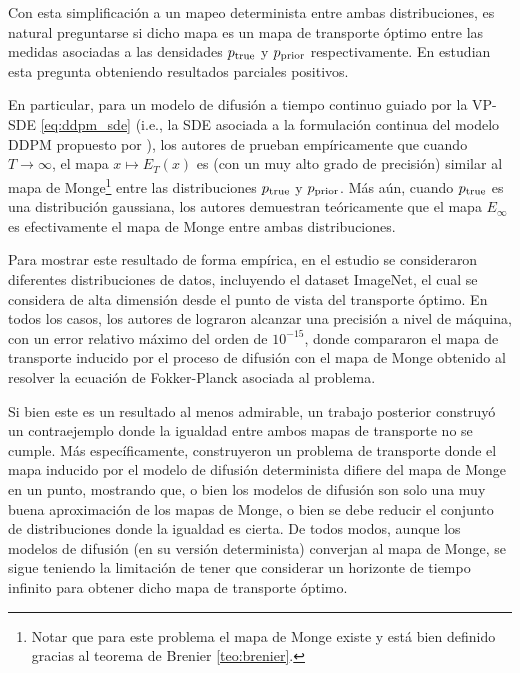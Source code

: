 Con esta simplificación a un mapeo determinista entre ambas distribuciones, es natural preguntarse si dicho mapa es un mapa de transporte óptimo entre las medidas asociadas a las densidades $p_{\operatorname{true}}$ y $p_{\operatorname{prior}}$ respectivamente. En \cite{khrulkov2022understandingddpmlatentcodes} estudian esta pregunta obteniendo resultados parciales positivos.

En particular, para un modelo de difusión a tiempo continuo guiado por la VP-SDE \eqref{eq:ddpm_sde} (i.e., la SDE asociada a la formulación continua del modelo DDPM propuesto por \cite{ho2020denoising}), los autores de \cite{khrulkov2022understandingddpmlatentcodes} prueban empíricamente que cuando $T\to\infty$, el mapa $x\mapsto E_T(x)$ es (con un muy alto grado de precisión) similar al mapa de Monge\footnote{Notar que para este problema el mapa de Monge existe y está bien definido gracias al teorema de Brenier \autoref{teo:brenier}.} entre las distribuciones $p_{\operatorname{true}}$ y $p_{\operatorname{prior}}$. Más aún, cuando $p_{\operatorname{true}}$ es una distribución gaussiana, los autores demuestran teóricamente que el mapa $E_\infty$ es efectivamente el mapa de Monge entre ambas distribuciones.

Para mostrar este resultado de forma empírica, en el estudio se consideraron diferentes distribuciones de datos, incluyendo el dataset ImageNet, el cual se considera de alta dimensión desde el punto de vista del transporte óptimo. En todos los casos, los autores de \cite{khrulkov2022understandingddpmlatentcodes} lograron alcanzar una precisión a nivel de máquina, con un error relativo máximo del orden de $10^{-15}$, donde compararon el mapa de transporte inducido por el proceso de difusión con el mapa de Monge obtenido al resolver la ecuación de Fokker-Planck asociada al problema.

Si bien este es un resultado al menos admirable, un trabajo posterior \cite{LAVENANT2022108225} construyó un contraejemplo donde la igualdad entre ambos mapas de transporte no se cumple. Más específicamente, construyeron un problema de transporte donde el mapa inducido por el modelo de difusión determinista difiere del mapa de Monge en un punto, mostrando que, o bien los modelos de difusión son solo una muy buena aproximación de los mapas de Monge, o bien se debe reducir el conjunto de distribuciones donde la igualdad es cierta. De todos modos, aunque los modelos de difusión (en su versión determinista) converjan al mapa de Monge, se sigue teniendo la limitación de tener que considerar un horizonte de tiempo infinito para obtener dicho mapa de transporte óptimo.

